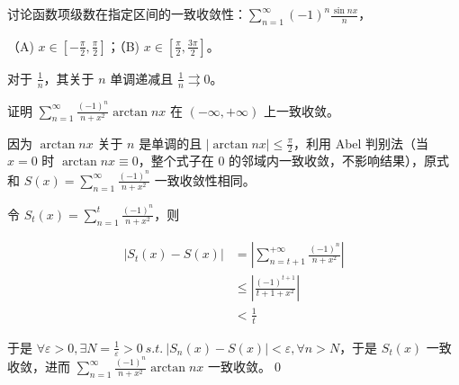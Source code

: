 \begin{ques}
	讨论函数项级数在指定区间的一致收敛性：$\displaystyle \sum _{n=1}^{\infty }( -1)^{n}\frac{\sin nx}{n}$，

（A) $\displaystyle x\in \left[ -\frac{\pi }{2} ,\frac{\pi }{2}\right]$；（B) $\displaystyle x\in \left[\frac{\pi }{2} ,\frac{3\pi }{2}\right]$。

\end{ques}


对于 $\displaystyle \frac{1}{n}$，其关于 $\displaystyle n$ 单调递减且 $\displaystyle \frac{1}{n} \rightrightarrows 0$。


\vspace{20\baselineskip}






\begin{ques}
	证明 $\displaystyle \sum _{n=1}^{\infty }\frac{( -1)^{n}}{n+x^{2}}\arctan nx$ 在 $\displaystyle ( -\infty ,+\infty )$ 上一致收敛。
\end{ques}



因为 $\displaystyle \arctan nx$ 关于 $\displaystyle n$ 是单调的且 $\displaystyle |\arctan nx|\leqslant \frac{\pi }{2}$，利用 Abel 判别法（当 $\displaystyle x=0$ 时 $\displaystyle \arctan nx\equiv 0$，整个式子在 $\displaystyle 0$ 的邻域内一致收敛，不影响结果），原式和 $\displaystyle S( x) =\sum _{n=1}^{\infty }\frac{( -1)^{n}}{n+x^{2}}$ 一致收敛性相同。

令 $\displaystyle S_{t}( x) =\sum _{n=1}^{t}\frac{( -1)^{n}}{n+x^{2}}$，则


\begin{align*}
	| S_{t}( x) -S( x)|  & =\left| \sum _{n=t+1}^{+\infty }\frac{( -1)^{n}}{n+x^{2}}\right| \\
	& \leqslant \left| \frac{( -1)^{t+1}}{t+1+x^{2}}\right| \\
	& < \frac{1}{t}
\end{align*}


于是 $\displaystyle \forall \varepsilon  >0,\exists N=\frac{1}{\varepsilon }  >0\ s.t.\ |S_{n}( x) -S( x) |< \varepsilon ,\forall n >N$，于是 $\displaystyle S_{t}( x)$ 一致收敛，进而 $\displaystyle \sum _{n=1}^{\infty }\frac{( -1)^{n}}{n+x^{2}}\arctan nx$ 一致收敛。\qed 

\ifx\allfiles\undefined

\fi